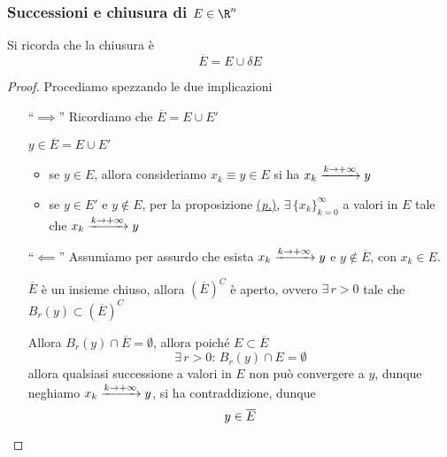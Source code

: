 \subsubsection{Successioni e chiusura di $ E \in \R^{n} $}

Si ricorda che la chiusura è \[
    \overline{E}=E\cup \delta E
\]

\begin{proof}
    Procediamo spezzando le due implicazioni
    \begin{itemize}
        \item [``$\implies$''] Ricordiamo che $ \overline{E}=E\cup E' $
        
        $ y \in \overline{E}=E\cup E' $
        \begin{itemize}
            \item se $ y \in E $, allora consideriamo $ x_{k}\equiv  y \in E$ si ha $ x_{k} \xrightarrow{k\to +\infty} y \displaystyle $
            \item se $ y \in E' $ e $ y \notin E $, per la proposizione \hyperref[prp:asgdfgdffger]{(\textit{p.})}, $ \exists\, \{x_{k} \}_{k=0}^\infty $ a valori in $ E $ tale che $ x_{k} \xrightarrow{k\to +\infty} y \displaystyle $
        \end{itemize}

        \item [``$\impliedby$''] Assumiamo per assurdo che esista $ x_{k} \xrightarrow{k\to +\infty} y \displaystyle $ e $ y\notin \overline{E} $, con $ x_{k} \in E $.
        
        $ \overline{E} $ è un insieme chiuso, allora $ (\overline{E})^{C} $ è aperto, ovvero $ \exists\,r>0 $ tale che $ B_{r}(y) \subset (\overline{E})^{C}  $

        Allora $ B_{r}(y)\cap \overline{E}=\emptyset $, allora poiché $ E \subset \overline{E} $ \[
            \exists\,r>0:\, B_{r}(y)\cap E = \emptyset 
        \]
        allora qualsiasi successione a valori in $ E $ non può convergere a $ y $, dunque neghiamo $ x_{k} \xrightarrow{k\to +\infty} y \displaystyle $, si ha contraddizione, dunque \[ y \in \overline{E} \qedhere\]
    \end{itemize}
\end{proof}

